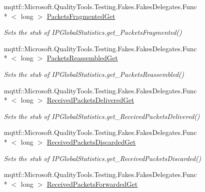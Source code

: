 \begin{DoxyCompactItemize}
mqttf\-::\-Microsoft.\-Quality\-Tools.\-Testing.\-Fakes.\-Fakes\-Delegates.\-Func\\*
$<$ long $>$ \hyperlink{class_system_1_1_net_1_1_network_information_1_1_fakes_1_1_stub_i_p_global_statistics_ae1e44b33c20a200146976d3576bbb266}{Packets\-Fragmented\-Get}
\begin{DoxyCompactList}\small\item\em Sets the stub of I\-P\-Global\-Statistics.\-get\-\_\-\-Packets\-Fragmented()\end{DoxyCompactList}\item 
mqttf\-::\-Microsoft.\-Quality\-Tools.\-Testing.\-Fakes.\-Fakes\-Delegates.\-Func\\*
$<$ long $>$ \hyperlink{class_system_1_1_net_1_1_network_information_1_1_fakes_1_1_stub_i_p_global_statistics_a1c5e2f76c030c8b7782d0601ca9f7a23}{Packets\-Reassembled\-Get}
\begin{DoxyCompactList}\small\item\em Sets the stub of I\-P\-Global\-Statistics.\-get\-\_\-\-Packets\-Reassembled()\end{DoxyCompactList}\item 
mqttf\-::\-Microsoft.\-Quality\-Tools.\-Testing.\-Fakes.\-Fakes\-Delegates.\-Func\\*
$<$ long $>$ \hyperlink{class_system_1_1_net_1_1_network_information_1_1_fakes_1_1_stub_i_p_global_statistics_a26549b98111f117269ff9d82a39fc1c8}{Received\-Packets\-Delivered\-Get}
\begin{DoxyCompactList}\small\item\em Sets the stub of I\-P\-Global\-Statistics.\-get\-\_\-\-Received\-Packets\-Delivered()\end{DoxyCompactList}\item 
mqttf\-::\-Microsoft.\-Quality\-Tools.\-Testing.\-Fakes.\-Fakes\-Delegates.\-Func\\*
$<$ long $>$ \hyperlink{class_system_1_1_net_1_1_network_information_1_1_fakes_1_1_stub_i_p_global_statistics_a9e10534f4f613481be692f8080ab08a6}{Received\-Packets\-Discarded\-Get}
\begin{DoxyCompactList}\small\item\em Sets the stub of I\-P\-Global\-Statistics.\-get\-\_\-\-Received\-Packets\-Discarded()\end{DoxyCompactList}\item 
mqttf\-::\-Microsoft.\-Quality\-Tools.\-Testing.\-Fakes.\-Fakes\-Delegates.\-Func\\*
$<$ long $>$ \hyperlink{class_system_1_1_net_1_1_network_information_1_1_fakes_1_1_stub_i_p_global_statistics_ad2221c460ebc2fc2ff965dde0618c6a6}{Received\-Packets\-Forwarded\-Get}

\end{DoxyCompactItemize}
